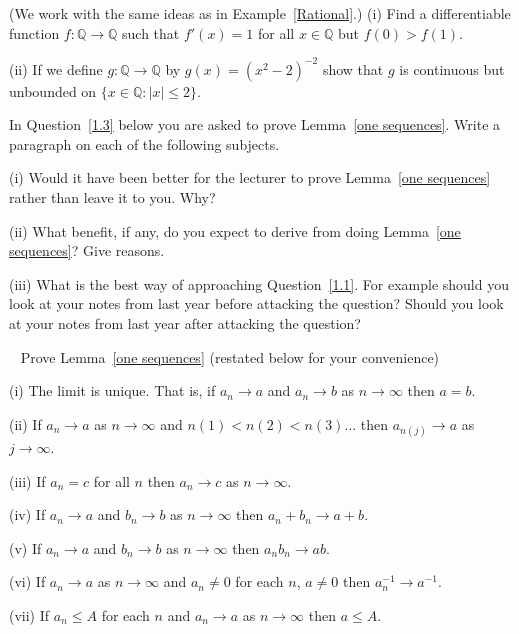 \begin{question}\label{1.1}
(We work with the same ideas as
in Example~\ref{Rational}.) 
(i) Find a differentiable function 
$f:{\mathbb Q}\rightarrow{\mathbb Q}$ such that
$f'(x)=1$ for all $x\in{\mathbb Q}$ but $f(0)>f(1)$.

(ii) If we define $g:{\mathbb Q}\rightarrow{\mathbb Q}$
by $g(x)=(x^{2}-2)^{-2}$ show that $g$ is continuous
but unbounded on $\{x\in{\mathbb Q}:|x|\leq 2\}$.
\end{question}
\begin{question}
In Question~\ref{1.3} below you are asked to
prove Lemma~\ref{one sequences}. Write a paragraph
on each of the following subjects.

(i) Would it have been better for the lecturer to prove
Lemma~\ref{one sequences} rather than leave it to you.
Why?

(ii) What benefit, if any, do you expect to derive from
doing Lemma~\ref{one sequences}? Give reasons.

(iii) What is the best way of approaching Question~\ref{1.1}.
For example should you look at your notes from last year
before attacking the question? Should you look at your notes 
from last year after attacking the question?
\end{question}
\begin{question}~\label{1.3}
Prove Lemma~\ref{one sequences}
(restated below for your convenience)

(i) The limit is unique. That is, if $a_{n}\rightarrow a$
and $a_{n}\rightarrow b$ as $n\rightarrow\infty$
then $a=b$.

(ii) If $a_{n}\rightarrow a$ as $n\rightarrow\infty$
and $n(1)<n(2)<n(3)\ldots$ then
$a_{n(j)}\rightarrow a$ as $j\rightarrow\infty$.

(iii) If $a_{n}=c$ for all $n$ then $a_{n}\rightarrow c$
as $n\rightarrow\infty$.

(iv) If $a_{n}\rightarrow a$ and $b_{n}\rightarrow b$
as $n\rightarrow\infty$ then
$a_{n}+b_{n}\rightarrow a+b$.

(v) If $a_{n}\rightarrow a$ and $b_{n}\rightarrow b$ 
as $n\rightarrow\infty$ then
$a_{n}b_{n}\rightarrow ab$.

(vi) If $a_{n}\rightarrow a$
as $n\rightarrow\infty$ and $a_{n}\neq 0$ for each $n$,
$a\neq 0$ then $a_{n}^{-1}\rightarrow a^{-1}$.

(vii) If $a_{n}\leq A$ for each $n$ and
$a_{n}\rightarrow a$
as $n\rightarrow\infty$ then $a\leq A$.


\end{question}
